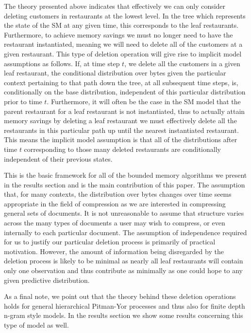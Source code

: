 \documentclass[12pt]{amsart}
\begin{document}
The theory presented above indicates that effectively we can only consider deleting customers in restaurants at the lowest level.  In the tree which represents the state of the SM at any given time, this corresponds to the leaf restaurants.  Furthermore, to achieve memory savings we must no longer need to have the restaurant instantiated, meaning we will need to delete all of the customers at a given restaurant.  This type of deletion operation will give rise to implicit model assumptions as follows. If, at time step $t$, we delete all the customers in a given leaf restaurant, the conditional distribution over bytes given the particular context pertaining to that path down the tree, at all subsequent time steps, is, conditionally on the base distribution, independent of this particular distribution prior to time $t$.  Furthermore, it will often be the case in the SM model that the parent restaurant for a leaf restaurant is not instantiated, thus to actually attain memory savings by deleting a leaf restaurant we must effectively delete all the restaurants in this particular path up until the nearest instantiated restaurant.  This means the implicit model assumption is that all of the distributions after time $t$ corresponding to those many deleted restaurants are conditionally independent of their previous states.

This is the basic framework for all of the bounded memory algorithms we present in the results section and is the main contribution of this paper.  The assumption that, for many contexts, the distribution over bytes changes over time seems appropriate in the field of compression as we are interested in compressing general sets of documents. It is not unreasonable to assume that structure varies across the many types of documents a user may wish to compress, or even internally to each particular document.  The assumption of independence required for us to justify our particular deletion process is primarily of practical motivation.  However, the amount of information being disregarded by the deletion process is likely to be minimal as nearly all leaf restaurants will contain only one observation and thus contribute as minimally as one could hope to any given predictive distribution.

As a final note, we point out that the theory behind these deletion operations holds for general hierarchical Pitman-Yor processes and thus also for finite depth n-gram style models.  In the results section we show some results concerning this type of model as well.
\end{document}
